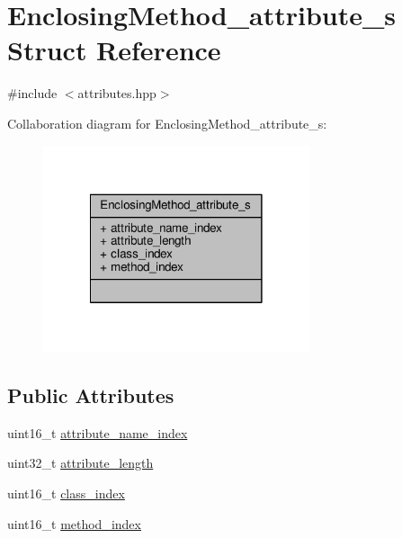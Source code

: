 \hypertarget{structEnclosingMethod__attribute__s}{\section{Enclosing\+Method\+\_\+attribute\+\_\+s Struct Reference}
\label{structEnclosingMethod__attribute__s}
}


{\ttfamily \#include $<$attributes.\+hpp$>$}



Collaboration diagram for Enclosing\+Method\+\_\+attribute\+\_\+s\+:\nopagebreak
\begin{figure}[H]
\begin{center}
\leavevmode
\includegraphics[width=222pt]{structEnclosingMethod__attribute__s__coll__graph}
\end{center}
\end{figure}
\subsection*{Public Attributes}
\begin{DoxyCompactItemize}
\item 
uint16\+\_\+t \hyperlink{structEnclosingMethod__attribute__s_ad2b896b9d74117aadabfcc0a451f0df4}{attribute\+\_\+name\+\_\+index}
\item 
uint32\+\_\+t \hyperlink{structEnclosingMethod__attribute__s_a47d67cf5da95073e23f63b07819726ac}{attribute\+\_\+length}
\item 
uint16\+\_\+t \hyperlink{structEnclosingMethod__attribute__s_a4f0350de4c8297324b3d4fa1afd5e5f8}{class\+\_\+index}
\item 
uint16\+\_\+t \hyperlink{structEnclosingMethod__attribute__s_ab6428de4b25c84e1ef61d3c806932823}{method\+\_\+index}
\end{DoxyCompactItemize}



